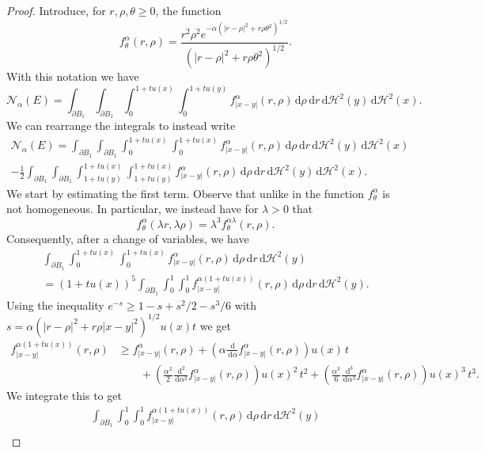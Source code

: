 \documentclass[a4paper,11pt,reqno]{amsart}
\numberwithin{equation}{section}
\theoremstyle{remark}
\theoremstyle{definition}
\newcommand{\dd}{\,\mathrm{d}}
\newcommand{\nl}{\mathcal{N}_{\alpha}}
\renewcommand{\geq}{\geqslant}
\begin{document}
\begin{proof} Introduce, for $r,\rho,\theta\geq 0$, the function
	\[
		f_{\theta}^{\alpha}(r,\rho) = \frac{r^2\rho^2 e^{-\alpha (|r-\rho|^2+r\rho\theta^2)^{1/2}}}{(|r-\rho|^2+r\rho\theta^2)^{1/2}}.
	\]
With this notation we have
	\[
		\nl(E) = \int_{\partial B_1}\int_{\partial B_1}\int_0^{1+tu(x)}\int_0^{1+tu(y)} f_{|x-y|}^{\alpha}(r,\rho) \dd\rho \dd r \dd\mathcal{H}^2(y) \dd\mathcal{H}^2(x).
	\]
We can rearrange the integrals to instead write
	\begin{multline}\label{eqn: Potential Exact}
		\nl(E) = \int_{\partial B_1}\int_{\partial B_1} \int_0^{1+t u(x)}\int_0^{1+tu(x)} f_{|x-y|}^{\alpha}(r,\rho) \dd\rho \dd r \dd\mathcal{H}^2(y)\dd\mathcal{H}^2(x) \\
 				-\frac{1}{2}\int_{\partial B_1}\int_{\partial B_1} \int_{1+tu(y)}^{1+t u(x)}\int_{1+tu(y)}^{1+tu(x)} f_{|x-y|}^{\alpha}(r,\rho) \dd\rho \dd r \dd\mathcal{H}^2(y)\dd\mathcal{H}^2(x).
	\end{multline}	
We start by estimating the first term. Observe that unlike in \cite[Lemma 5.3]{FFMMM} the function $f_{\theta}^{\alpha}$ is not homogeneous. In particular, we instead have for $\lambda>0$ that
	\[
		f_{\theta}^{\alpha}(\lambda r, \lambda \rho) = \lambda^3 f_{\theta}^{\alpha \lambda} (r,\rho).
	\]
Consequently, after a change of variables, we have 
	\begin{multline}\label{eqn: Potential Estimate Term 1.1}
		\int_{\partial B_1} \int_0^{1+t u(x)}\int_0^{1+tu(x)} f_{|x-y|}^{\alpha}(r,\rho) \dd\rho \dd r \dd\mathcal{H}^2(y) \\ = 
			 (1+tu(x))^5 \int_{\partial B_1} \int_0^1\int_0^1 f_{|x-y|}^{\alpha(1+tu(x))}(r,\rho) \dd\rho \dd r \dd\mathcal{H}^2(y).
	\end{multline}
Using the inequality $e^{-s} \geq 1-s+s^2/2-s^3/6$ with $s=\alpha (|r-\rho|^2+r\rho|x-y|^2)^{1/2} u(x)t$ we get
	\begin{align*}
		f_{|x-y|}^{\alpha(1+tu(x))}(r,\rho) &\geq f_{|x-y|}^{\alpha}(r,\rho) + \left(\alpha\frac{\dd}{\dd\alpha} f_{|x-y|}^{\alpha}(r,\rho)\right) u(x)\, t\\
		&\qquad+ \left(\frac{\alpha^2}{2}\frac{\dd^2}{\dd\alpha^2} f_{|x-y|}^{\alpha}(r,\rho)\right) u(x)^2\, t^2+ \left(\frac{\alpha^3}{6}\frac{\dd^3}{\dd\alpha^3} f_{|x-y|}^{\alpha}(r,\rho)\right) u(x)^3\, t^3.
	\end{align*}
We integrate this to get
	\begin{multline}\label{eqn: Potential Estimate Almost Homogeneous Part}
		\int_{\partial B_1} \int_0^1\int_0^1 f_{|x-y|}^{\alpha(1+tu(x))}(r,\rho) \dd\rho \dd r \dd\mathcal{H}^2(y)\\

\end{multline}
\end{proof}
\end{document}
